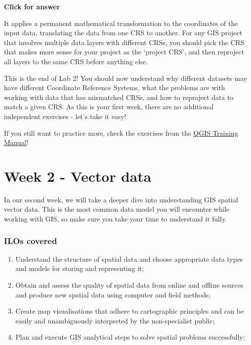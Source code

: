 \documentclass[
  letterpaper,
  DIV=11,
  numbers=noendperiod]{scrreprt}
\begin{document}
\begin{tcolorbox}[enhanced jigsaw, leftrule=.75mm, colframe=quarto-callout-important-color-frame, breakable, toprule=.15mm, bottomrule=.15mm, arc=.35mm, rightrule=.15mm, opacityback=0, colback=white, left=2mm]

\vspace{-3mm}\textbf{Click for answer}\vspace{3mm}

It applies a permanent mathematical transformation to the coordinates of
the input data, translating the data from one CRS to another. For any
GIS project that involves multiple data layers with different CRSs, you
should pick the CRS that makes more sense for your project as the
`project CRS', and then reproject all layers to the same CRS before
anything else.

\end{tcolorbox}

This is the end of Lab 2! You should now understand why different
datasets may have different Coordinate Reference Systems, what the
problems are with working with data that has mismatched CRSs, and how to
reproject data to match a given CRS. As this is your first week, there
are no additional independent exercises - let's take it easy!

If you still want to practice more, check the exercises from the
\href{https://docs.qgis.org/3.34/en/docs/training_manual/basic_map/index.html}{QGIS
Training Manual}!

\part{Week 2 - Vector data}

In our second week, we will take a deeper dive into understanding GIS
spatial vector data. This is the most common data model you will
encounter while working with GIS, so make sure you take your time to
understand it fully.

\section*{ILOs covered}\label{ilos-covered-1}


\begin{enumerate}
\def\labelenumi{\arabic{enumi}.}
\item
  Understand the structure of spatial data and choose appropriate data
  types and models for storing and representing it;
\item
  Obtain and assess the quality of spatial data from online and offline
  sources and produce new spatial data using computer and field methods;
\item
  Create map visualisations that adhere to cartographic principles and
  can be easily and unambiguously interpreted by the non-specialist
  public;
\item
  Plan and execute GIS analytical steps to solve spatial problems
  successfully;
\end{enumerate}
\end{document}
